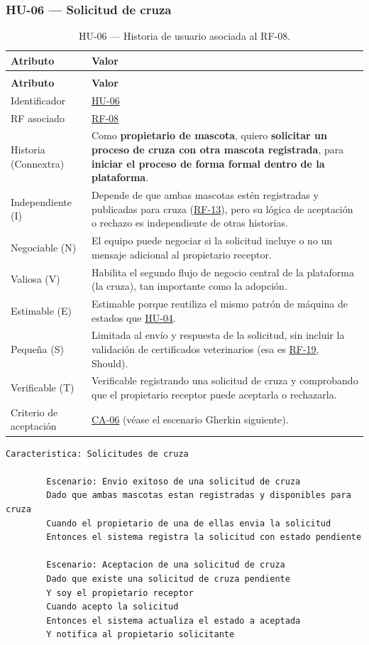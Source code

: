 \documentclass[journal,onecolumn]{IEEEtran}
\makeatletter
\newenvironment{atributos}[2]{%
	\small
	\begin{longtable}{@{}>{\raggedright\arraybackslash}p{4.2cm} >{\raggedright\arraybackslash}p{11.2cm}@{}}
		\caption{#2}\label{tab:#1}\\
		\toprule
		\textbf{Atributo} & \textbf{Valor} \\
		\midrule
		\endfirsthead
		\multicolumn{2}{@{}l}{\small\itshape (continuación)}\\
		\toprule
		\textbf{Atributo} & \textbf{Valor} \\
		\midrule
		\endhead
		\bottomrule
		\endlastfoot
	}{%
	\end{longtable}
	\normalsize
}
\makeatother
\begin{document}
	\subsubsection{HU-06 --- Solicitud de cruza}
	
	\begin{atributos}{HU-06}{HU-06 --- Historia de usuario asociada al RF-08.}
		Identificador & \hyperref[tab:HU-06]{HU-06} \\
		RF asociado & \hyperref[tab:RF-08]{RF-08} \\
		Historia (Connextra) & Como \textbf{propietario de mascota}, quiero \textbf{solicitar un proceso de cruza con otra mascota registrada}, para \textbf{iniciar el proceso de forma formal dentro de la plataforma}. \\
		Independiente (I) & Depende de que ambas mascotas estén registradas y publicadas para cruza (\hyperref[tab:RF-13]{RF-13}), pero su lógica de aceptación o rechazo es independiente de otras historias. \\
		Negociable (N) & El equipo puede negociar si la solicitud incluye o no un mensaje adicional al propietario receptor. \\
		Valiosa (V) & Habilita el segundo flujo de negocio central de la plataforma (la cruza), tan importante como la adopción. \\
		Estimable (E) & Estimable porque reutiliza el mismo patrón de máquina de estados que \hyperref[tab:HU-04]{HU-04}. \\
		Pequeña (S) & Limitada al envío y respuesta de la solicitud, sin incluir la validación de certificados veterinarios (esa es \hyperref[tab:RF-19]{RF-19}, Should). \\
		Verificable (T) & Verificable registrando una solicitud de cruza y comprobando que el propietario receptor puede aceptarla o rechazarla. \\
		Criterio de aceptación & \hyperref[lst:ca06]{CA-06} (véase el escenario Gherkin siguiente). \\
	\end{atributos}
	
	\begin{lstlisting}[style=gherkin,caption={CA-06 --- Escenario de aceptación de la historia HU-06.},label={lst:ca06}]
		Caracteristica: Solicitudes de cruza
		
		Escenario: Envio exitoso de una solicitud de cruza
		Dado que ambas mascotas estan registradas y disponibles para cruza
		Cuando el propietario de una de ellas envia la solicitud
		Entonces el sistema registra la solicitud con estado pendiente
		
		Escenario: Aceptacion de una solicitud de cruza
		Dado que existe una solicitud de cruza pendiente
		Y soy el propietario receptor
		Cuando acepto la solicitud
		Entonces el sistema actualiza el estado a aceptada
		Y notifica al propietario solicitante
	\end{lstlisting}
	
\end{document}
